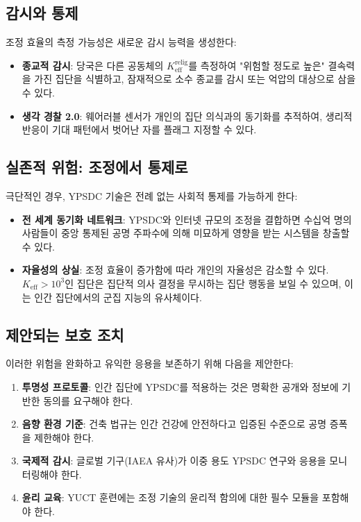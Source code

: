\documentclass[12pt,a4paper]{article}
\begin{document}
	\subsection{감시와 통제}
	
	조정 효율의 측정 가능성은 새로운 감시 능력을 생성한다:
	\begin{itemize}
		\item \textbf{종교적 감시}: 당국은 다른 공동체의 $K_{\mathrm{eff}}^{\mathrm{relig}}$를 측정하여 "위험할 정도로 높은" 결속력을 가진 집단을 식별하고, 잠재적으로 소수 종교를 감시 또는 억압의 대상으로 삼을 수 있다.
		
		\item \textbf{생각 경찰 2.0}: 웨어러블 센서가 개인의 집단 의식과의 동기화를 추적하여, 생리적 반응이 기대 패턴에서 벗어난 자를 플래그 지정할 수 있다.
	\end{itemize}
	
	\subsection{실존적 위험: 조정에서 통제로}
	
	극단적인 경우, YPSDC 기술은 전례 없는 사회적 통제를 가능하게 한다:
	\begin{itemize}
		\item \textbf{전 세계 동기화 네트워크}: YPSDC와 인터넷 규모의 조정을 결합하면 수십억 명의 사람들이 중앙 통제된 공명 주파수에 의해 미묘하게 영향을 받는 시스템을 창출할 수 있다.
		
		\item \textbf{자율성의 상실}: 조정 효율이 증가함에 따라 개인의 자율성은 감소할 수 있다. $K_{\mathrm{eff}} > 10^3$인 집단은 집단적 의사 결정을 무시하는 집단 행동을 보일 수 있으며, 이는 인간 집단에서의 군집 지능의 유사체이다.
	\end{itemize}
	
	\subsection{제안되는 보호 조치}
	
	이러한 위험을 완화하고 유익한 응용을 보존하기 위해 다음을 제안한다:
	\begin{enumerate}
		\item \textbf{투명성 프로토콜}: 인간 집단에 YPSDC를 적용하는 것은 명확한 공개와 정보에 기반한 동의를 요구해야 한다.
		
		\item \textbf{음향 환경 기준}: 건축 법규는 인간 건강에 안전하다고 입증된 수준으로 공명 증폭을 제한해야 한다.
		
		\item \textbf{국제적 감시}: 글로벌 기구(IAEA 유사)가 이중 용도 YPSDC 연구와 응용을 모니터링해야 한다.
		
		\item \textbf{윤리 교육}: YUCT 훈련에는 조정 기술의 윤리적 함의에 대한 필수 모듈을 포함해야 한다.
	\end{enumerate}
	
\end{document}
